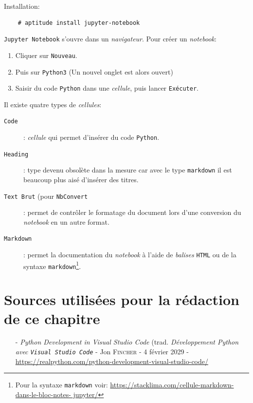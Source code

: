 Installation:
\begin{verbatim}
    # aptitude install jupyter-notebook
\end{verbatim}
\medskip

\texttt{Jupyter Notebook} s'ouvre dans un \textit{navigateur}. Pour créer un \textit{notebook}:
\begin{enumerate}
	\item Cliquer sur \texttt{Nouveau}.
	\item Puis sur \texttt{Python3} (Un nouvel onglet est alors ouvert)
	\item Saisir du code \texttt{Python} dans une \textit{cellule}, puis lancer \texttt{Exécuter}.
\end{enumerate}
\medskip

Il existe quatre types de \textit{cellules}: 
\begin{description}
	\item[\texttt{Code}]: \textit{cellule} qui permet d'insérer du code \texttt{Python}.
	\item[\texttt{Heading}]: type devenu obsolète dans la mesure car avec le type \texttt{markdown} il est beaucoup plus aisé d'insérer des titres.
	\item[\texttt{Text Brut} (pour \texttt{NbConvert}]: permet de contrôler le formatage du document lors d'une conversion du \textit{notebook} en un autre format.
	\item[\texttt{Markdown}]: permet la documentation du \textit{notebook} à l'aide de \textit{balises} \texttt{HTML} ou de la syntaxe \texttt{markdown}\footnote{Pour la syntaxe \texttt{markdown} voir: \url{https://stacklima.com/cellule-markdown-dans-le-bloc-notes- jupyter/}}.
\end{description}
\medskip

\section*{Sources utilisées pour la rédaction de ce chapitre}
\begin{itemize}
	\item[-] \textit{Python Development in Visual Studio Code} (trad. \textit{Développement \textit{Python} avec \texttt{Visual Studio Code}} - Jon \textsc{Fincher} - 4 février 2029 - \url{https://realpython.com/python-development-visual-studio-code/} 
\end{itemize}
